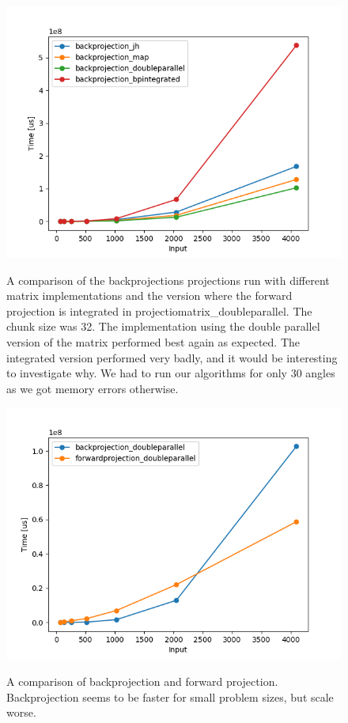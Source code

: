 \begin{figure}[h]
\includegraphics{images/backprojection_32.png}
\label{fpcompare}
  \caption{A comparison of the backprojections projections run with different matrix implementations and the version where the forward projection is integrated in projectiomatrix\_doubleparallel. The chunk size was 32. The implementation using the double parallel version of the matrix performed best again as expected. The integrated version performed very badly, and it would be interesting to investigate why. We had to run our algorithms for only 30 angles as we got memory errors otherwise.}
\end{figure}
\begin{figure}[h]
\includegraphics{images/backvsforwardprojection_32.png}
\label{fpcompare}
  \caption{A comparison of backprojection and forward projection. Backprojection seems to be faster for small problem sizes, but scale worse.}
\end{figure}
